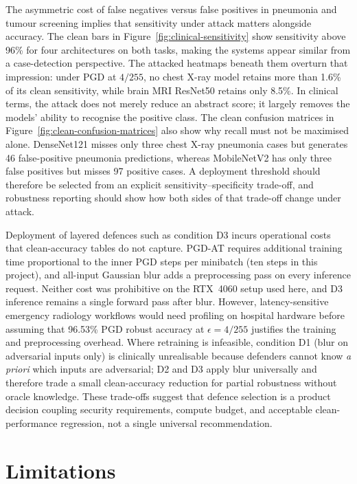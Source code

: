 \documentclass[12pt,a4paper,oneside]{report}
\begin{document}
The asymmetric cost of false negatives versus false positives in pneumonia and tumour screening implies that sensitivity under attack matters alongside accuracy. The clean bars in Figure~\ref{fig:clinical-sensitivity} show sensitivity above 96\% for four architectures on both tasks, making the systems appear similar from a case-detection perspective. The attacked heatmaps beneath them overturn that impression: under PGD at $4/255$, no chest X-ray model retains more than 1.6\% of its clean sensitivity, while brain MRI ResNet50 retains only 8.5\%. In clinical terms, the attack does not merely reduce an abstract score; it largely removes the models' ability to recognise the positive class. The clean confusion matrices in Figure~\ref{fig:clean-confusion-matrices} also show why recall must not be maximised alone. DenseNet121 misses only three chest X-ray pneumonia cases but generates 46 false-positive pneumonia predictions, whereas MobileNetV2 has only three false positives but misses 97 positive cases. A deployment threshold should therefore be selected from an explicit sensitivity--specificity trade-off, and robustness reporting should show how both sides of that trade-off change under attack.

Deployment of layered defences such as condition D3 incurs operational costs that clean-accuracy tables do not capture. PGD-AT requires additional training time proportional to the inner PGD steps per minibatch (ten steps in this project), and all-input Gaussian blur adds a preprocessing pass on every inference request. Neither cost was prohibitive on the RTX~4060 setup used here, and D3 inference remains a single forward pass after blur. However, latency-sensitive emergency radiology workflows would need profiling on hospital hardware before assuming that 96.53\% PGD robust accuracy at $\epsilon = 4/255$ justifies the training and preprocessing overhead. Where retraining is infeasible, condition D1 (blur on adversarial inputs only) is clinically unrealisable because defenders cannot know \emph{a priori} which inputs are adversarial; D2 and D3 apply blur universally and therefore trade a small clean-accuracy reduction for partial robustness without oracle knowledge. These trade-offs suggest that defence selection is a product decision coupling security requirements, compute budget, and acceptable clean-performance regression, not a single universal recommendation.

\section{Limitations}
\label{sec:disc-limitations}
\end{document}
